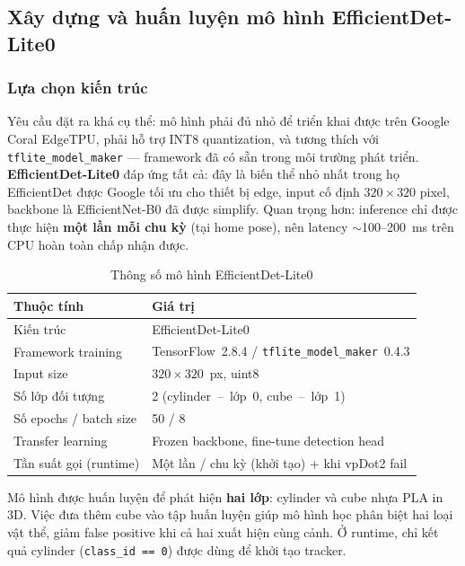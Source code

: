 \subsection{Xây dựng và huấn luyện mô hình EfficientDet-Lite0}
\label{subsec:ai3-model}

\subsubsection*{Lựa chọn kiến trúc}

Yêu cầu đặt ra khá cụ thể: mô hình phải đủ nhỏ để triển khai
được trên Google Coral EdgeTPU, phải hỗ trợ INT8 quantization, và
tương thích với \texttt{tflite\_model\_maker} --- framework đã có
sẵn trong môi trường phát triển. \textbf{EfficientDet-Lite0}
đáp ứng tất cả: đây là biến thể nhỏ nhất trong họ EfficientDet
được Google tối ưu cho thiết bị edge, input cố định $320\times320$
pixel, backbone là EfficientNet-B0 đã được simplify. Quan trọng
hơn: inference chỉ được thực hiện \textbf{một lần mỗi chu kỳ}
(tại home pose), nên latency $\sim$100--200~ms trên CPU hoàn toàn
chấp nhận được.

\begin{table}[htbp]
  \centering
  \caption{Thông số mô hình EfficientDet-Lite0}
  \label{tab:ai3-model}
  \small
  \begin{tabular}{ll}
    \toprule
    \textbf{Thuộc tính}       & \textbf{Giá trị} \\
    \midrule
    Kiến trúc                 & EfficientDet-Lite0 \\
    Framework training        & TensorFlow~2.8.4 / \texttt{tflite\_model\_maker}~0.4.3 \\
    Input size                & $320\times320$~px, uint8 \\
    Số lớp đối tượng          & 2 (cylinder~--~lớp~0, cube~--~lớp~1) \\
    Số epochs / batch size    & 50 / 8 \\
    Transfer learning         & Frozen backbone, fine-tune detection head \\
    Tần suất gọi (runtime)     & Một lần / chu kỳ (khởi tạo) + khi vpDot2 fail \\
    \bottomrule
  \end{tabular}
\end{table}

Mô hình được huấn luyện để phát hiện \textbf{hai lớp}: cylinder và
cube nhựa PLA in 3D. Việc đưa thêm cube vào tập huấn luyện giúp
mô hình học phân biệt hai loại vật thể, giảm false positive khi cả
hai xuất hiện cùng cảnh. Ở runtime, chỉ kết quả cylinder
(\texttt{class\_id~==~0}) được dùng để khởi tạo tracker.

